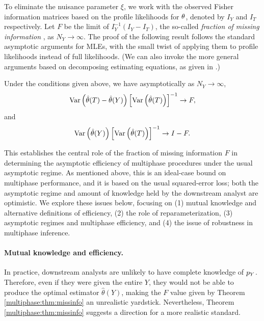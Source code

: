 To eliminate the nuisance parameter $\xi$, we work with the observed Fisher information matrices based on the profile likelihoods for $\theta$, denoted by $I_Y$ and $I_T$ respectively.   Let $F$ be the limit of $I_Y^{-1}(I_Y-I_T)$, the so-called \textit{fraction of missing information} \citep[see][]{Meng1991}, as $N_Y \rightarrow \infty$.
 The proof of the following result follows the standard asymptotic arguments for MLEs, with the small twist of applying them to profile likelihoods instead of full likelihoods. (We can also invoke the more general arguments based on decomposing estimating equations, as given in \citet{Xie2012}.) 
%
\begin{theorem}
\label{multiphase:thm:missinfo} Under the conditions given above, we have asymptotically as $N_Y \rightarrow \infty$,
\begin{equation}\label{multiphase:eq:regret}
\Var\left(\est(T) - \est(Y)\right) \left[\Var\left(\est(T)\right)\right]^{-1} \rightarrow F,
\end{equation}
and
\begin{equation}\label{multiphase:eq:frac}
\Var\left(\est(Y)\right) \left[\Var\left(\est(T)\right)\right]^{-1} \rightarrow I - F.
\end{equation}
\end{theorem}

This establishes the central role of the fraction of missing information $F$ in determining the asymptotic efficiency of multiphase procedures under the usual asymptotic regime.
As mentioned above, this is an ideal-case bound on multiphase performance, and it is based on the usual squared-error loss; both the asymptotic regime and amount of knowledge held by the downstream analyst are optimistic.
We explore these issues below, focusing on (1) mutual knowledge and alternative definitions of efficiency, (2) the role of reparameterization, (3) asymptotic regimes and multiphase efficiency, and (4) the issue of robustness in multiphase inference.

\paragraph{Mutual knowledge and efficiency.}
In practice, downstream analysts are unlikely to have complete knowledge of $p_Y$. Therefore, even if they were given the entire $Y$, they would not be able to produce the optimal estimator $\hat\theta(Y)$, making 
the $F$ value given by Theorem \ref{multiphase:thm:missinfo} an unrealistic 
yardstick. Nevertheless, Theorem \ref{multiphase:thm:missinfo} suggests a direction for a more realistic standard. 

